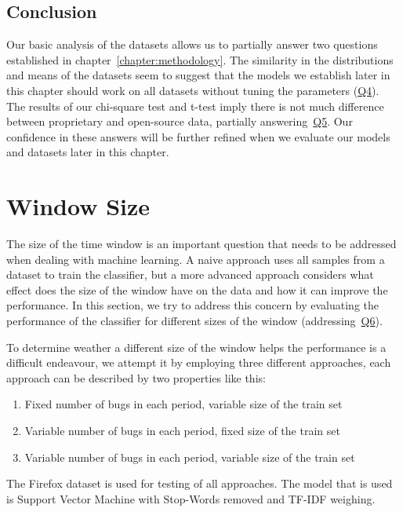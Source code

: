 \subsection{Conclusion}

Our basic analysis of the datasets allows us to partially answer two questions established in chapter~\ref{chapter:methodology}. The similarity in the distributions and means of the datasets seem to suggest that the models we establish later in this chapter should work on all datasets without tuning the parameters (\hyperlink{question:4}{Q4}). The results of our chi-square test and t-test imply there is not much difference between proprietary and open-source data, partially answering~\hyperlink{question:5}{Q5}. Our confidence in these answers will be further refined when we evaluate our models and datasets later in this chapter.

\section{Window Size}
\label{section:window-size}

The size of the time window is an important question that needs to be addressed when dealing with machine learning. A naive approach uses all samples from a dataset to train the classifier, but a more advanced approach considers what effect does the size of the window have on the data and how it can improve the performance. In this section, we try to address this concern by evaluating the performance of the classifier for different sizes of the window (addressing~\hyperlink{question:6}{Q6}).

To determine weather a different size of the window helps the performance is a difficult endeavour, we attempt it by employing three different approaches, each approach can be described by two properties like this:

\begin{enumerate}
 \item Fixed number of bugs in each period, variable size of the train set
 \item Variable number of bugs in each period, fixed size of the train set
 \item Variable number of bugs in each period, variable size of the train set
\end{enumerate}

The Firefox dataset is used for testing of all approaches. The model that is used is Support Vector Machine with Stop-Words removed and TF-IDF weighing.

